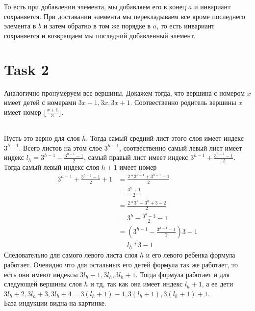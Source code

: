 \documentclass[12pt]{exam}
\begin{document}
То есть при добавлении элемента, мы добавляем его в конец $a$ и инвариант сохраняется.
При доставании элемента мы перекладываем все кроме последнего элемента в $b$ и 
затем обратно в том же порядке в $a$, то есть инвариант сохраняется и возвращаем мы последний добавленный элемент.

\section*{Task 2}
Аналогично пронумеруем все вершины.
Докажем тогда, что вершина с номером $x$ имеет детей с номерами $3x - 1, 3x, 3x + 1$.
Соотвественно родитель вершины $x$ имеет номер $\lfloor \frac{x + 1}{3} \rfloor$.

\\
Пусть это верно для слоя $h$. 
Тогда самый средний лист этого слоя имеет индекс $3^{h - 1}$. 
Всего листов на этом слое $3^{h - 1}$, 
соотвественно самый левый лист имеет индекс $l_h = 3^{h - 1} - \frac{3^{h - 1} - 1}{2}$, 
самый правый лист имеет индекс $3^{h - 1} + \frac{3^{h - 1} - 1}{2}$. \\
Тогда самый левый индекс слоя $h + 1$ имеет номер 
\begin{align*}
    3^{h - 1} + \frac{3^{h - 1} - 1}{2} + 1 
        &= \frac{2 * 3^{h - 1} + 3^{h - 1} + 1}{2} \\
        &= \frac{3^h + 1}{2} \\
        &= \frac{2 * 3^h - 3^h + 3 - 2}{2} \\
        &= 3^h - \frac{3^h - 3}{2} - 1 \\
        &= \left( 3^{h - 1} - \frac{3^{h - 1} - 1}{2} \right) 3 - 1\\
        &= l_h * 3 - 1
\end{align*}
Следовательно для самого левого листа слоя $h$ и его левого ребенка формула работает.
Очевидно что для остальных его детей формула так же работает, 
то есть они имеют индексы $3 l_h -1, 3 l_h, 3 l_h + 1$. 
Тогда формула работает и для следующей вершины слоя $h$ и тд, так как она имеет индекс 
$l_h + 1$, а ее дети $3l_h + 2, 3l_h + 3, 3l_h + 4 = 3(l_h + 1) - 1, 3(l_h + 1), 3(l_h + 1) + 1$.\\
База индукции видна на картинке. 
\end{document}
